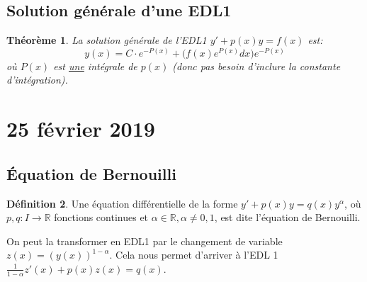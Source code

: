 \documentclass{article}
\theoremstyle{plain}
\newtheorem{thm}{Théorème}
\theoremstyle{definition}
\newtheorem{defn}[thm]{Définition}
\theoremstyle{remark}
\begin{document}
\subsection{Solution générale d'une EDL1}
\begin{thm}
La solution générale de l'EDL1 $y' + p(x)y = f(x)$ est:
\begin{equation}
	y(x) = C \cdot e^{-P(x)} + \bigl( f(x) e^{P(x)} dx\bigr) e^{-P(x)}
\end{equation}
où $P(x)$ est \underline{une} intégrale de $p(x)$ (donc pas besoin d'inclure la constante d'intégration).
\end{thm}

\section{25 février 2019}
\subsection{Équation de Bernouilli}
\begin{defn}
Une équation différentielle de la forme $y' + p(x)y = q(x) y^\alpha$, où $p, q: I \to \mathbb R$ fonctions continues et $\alpha \in \mathbb R, \alpha \neq 0, 1$, est dite l'équation de Bernouilli.
\end{defn}
On peut la transformer en EDL1 par le changement de variable $z(x) = (y(x))^{1-\alpha}$. Cela nous permet d'arriver à l'EDL 1 $\frac{1}{1-\alpha}z'(x) + p(x)z(x) = q(x)$.
\end{document}
